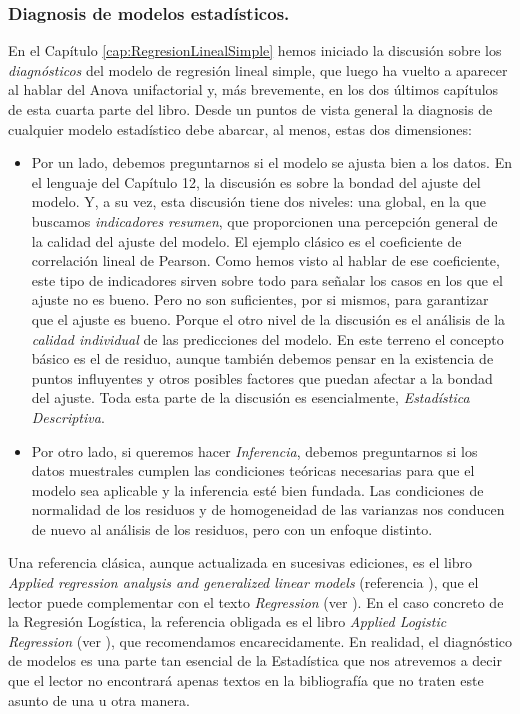 \subsubsection*{Diagnosis de modelos estadísticos.}

En el Capítulo \ref{cap:RegresionLinealSimple} hemos iniciado la discusión sobre los {\em diagnósticos} del modelo de regresión lineal simple, que luego ha vuelto a aparecer al hablar del Anova unifactorial y, más brevemente, en los dos últimos capítulos de esta cuarta parte del libro. Desde un puntos de vista general la diagnosis de cualquier modelo estadístico debe abarcar, al menos, estas dos dimensiones:

\begin{itemize}

  \item Por un lado, debemos preguntarnos si el modelo se ajusta bien a los datos. En el lenguaje del Capítulo 12, la discusión es sobre la bondad del ajuste del modelo. Y, a su vez, esta discusión tiene dos niveles: una global, en la que buscamos {\em indicadores resumen}, que proporcionen una percepción general de la calidad del ajuste del modelo. El ejemplo clásico es el coeficiente de correlación lineal de Pearson. Como hemos visto al hablar de ese coeficiente, este tipo de indicadores sirven sobre todo para señalar los casos en los que el ajuste no es bueno. Pero no son suficientes, por si mismos, para garantizar que el ajuste es bueno. Porque el otro nivel de la discusión es el análisis de la {\em calidad individual} de las predicciones del modelo. En este terreno el concepto básico es el de residuo, aunque también debemos pensar en la existencia de puntos influyentes y otros posibles factores que puedan afectar a la bondad del ajuste. Toda esta parte de la discusión es esencialmente, {\em Estadística Descriptiva}.

  \item Por otro lado, si queremos hacer {\em Inferencia}, debemos preguntarnos si los datos muestrales cumplen las condiciones teóricas necesarias para que el modelo sea aplicable y la inferencia esté bien fundada. Las condiciones de normalidad de los residuos y de homogeneidad de las varianzas nos conducen de nuevo al análisis de los residuos, pero con un enfoque distinto.

\end{itemize}

Una referencia clásica, aunque actualizada en sucesivas ediciones, es el libro {\em Applied regression analysis and generalized linear models} (referencia \cite{fox2015applied}), que el lector puede complementar con el texto {\em Regression} (ver \cite{fahrmeir2007regression}). En el caso concreto de la Regresión Logística, la referencia obligada es el libro {\em Applied Logistic Regression} (ver \cite{hosmer2013applied}), que recomendamos encarecidamente. En realidad, el diagnóstico de modelos es una parte tan esencial de la Estadística que nos atrevemos a decir que el lector no encontrará apenas textos en la bibliografía que no traten este asunto de una u otra manera.

